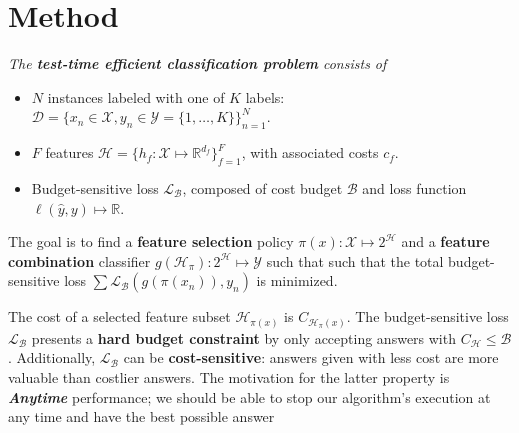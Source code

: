 
\section{Method}
{\itshape
The \textbf{test-time efficient classification problem} consists of
\vspace{-.5em}
\begin{itemize}
\addtolength{\itemsep}{-.55\baselineskip}
\item
$N$ instances labeled with one of $K$ labels: ${\mathcal{D} = \{x_n \in \mathcal{X}, y_n \in \mathcal{Y} = \{1, \dots, K\}\}_{n=1}^N}$.

\item
$F$ features $\mathcal{H} = \{h_f : \mathcal{X} \mapsto \mathbb{R}^{d_f} \}_{f=1}^F$, with associated costs $c_f$.

\item Budget-sensitive loss $\mathcal{L}_\mathcal{B}$, composed of cost budget $\mathcal{B}$ and loss function ${\ell(\hat{y}, y) \mapsto \mathbb{R}}$.
\end{itemize}

The goal is to find a \textbf{feature selection} policy $\pi(x): \mathcal{X} \mapsto 2^\mathcal{H}$ and a \textbf{feature combination} classifier $g(\mathcal{H}_\pi) : 2^\mathcal{H} \mapsto \mathcal{Y}$ such that such that the total budget-sensitive loss $\sum \mathcal{L}_\mathcal{B}(g(\pi(x_n)), y_n)$ is minimized.
}

The cost of a selected feature subset $\mathcal{H}_{\pi(x)}$ is $C_{\mathcal{H}_\pi(x)}$.
The budget-sensitive loss $\mathcal{L}_\mathcal{B}$ presents a \textbf{hard budget constraint} by only accepting answers with $C_{\mathcal{H}} \leq \mathcal{B}$.
Additionally, $\mathcal{L}_\mathcal{B}$ can be \textbf{cost-sensitive}: answers given with less cost are more valuable than costlier answers.
The motivation for the latter property is \textbf{\emph{Anytime}} performance; we should be able to stop our algorithm's execution at any time and have the best possible answer

